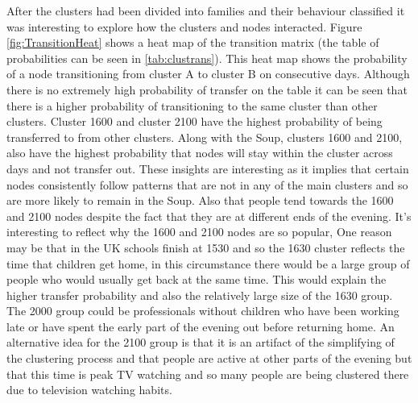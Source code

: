 After the clusters had been divided into families and their behaviour classified it was interesting to explore how the clusters and nodes interacted. Figure \ref{fig:TransitionHeat} shows a heat map of the transition matrix (the table of probabilities can be seen in \ref{tab:clustrans}). This heat map shows the probability of a node transitioning from cluster A to cluster B on consecutive days. Although there is no extremely high probability of transfer on the table it can be seen that there is a higher probability of transitioning to the same cluster than other clusters. Cluster 1600 and cluster 2100 have the highest probability of being transferred to from other clusters. 
Along with the Soup, clusters 1600 and 2100, also have the highest probability that nodes will stay within the cluster across days and not transfer out.
These insights are interesting as it implies that certain nodes consistently follow patterns that are not in any of the main clusters and so are more likely to remain in the Soup. Also that people tend towards the 1600 and 2100 nodes despite the fact that they are at different ends of the evening. It's interesting to reflect why the 1600 and 2100 nodes are so popular, 
One reason may be that in the UK schools finish at 1530 and so the 1630 cluster reflects the time that children get home, in this circumstance there would be a large group of people who would usually get back at the same time. This would explain the higher transfer probability and also the relatively large size of the 1630 group. The 2000 group could be professionals without children who have been working late or have spent the early part of the evening out before returning home. An alternative idea for the 2100 group is that it is an artifact of the simplifying of the clustering process and that people are active at other parts of the evening but that this time is peak TV watching and so many people are being clustered there due to television watching habits.


